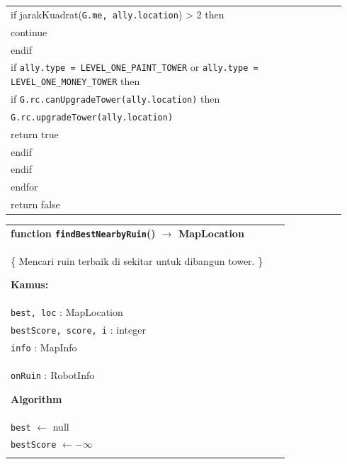 \documentclass{article}
\newenvironment{pseudobox}
{
\centering
\begin{longtable}{|p{0.94\linewidth}|}
\hline
}
{
\\ \hline
\end{longtable}
\vspace{0.05cm}
}
\begin{document}
\begin{enumerate}[label=\alph*.]
\begin{enumerate}[label=\alph*.]
\begin{pseudobox}
\hspace*{3em}if jarakKuadrat(\texttt{G.me, ally.location}) > 2 then \\
\hspace*{4.5em}continue \\
\hspace*{3em}endif \\

\hspace*{3em}if \texttt{ally.type = LEVEL\_ONE\_PAINT\_TOWER} or \texttt{ally.type = LEVEL\_ONE\_MONEY\_TOWER} then \\
\hspace*{4.5em}if \texttt{G.rc.canUpgradeTower(ally.location)} then \\
\hspace*{6em}\texttt{G.rc.upgradeTower(ally.location)} \\
\hspace*{6em}return true \\
\hspace*{4.5em}endif \\
\hspace*{3em}endif \\
\hspace*{1.5em}endfor \\

\hspace*{1.5em}return false
\end{pseudobox}

\begin{pseudobox}
\textbf{function \texttt{findBestNearbyRuin}() $\rightarrow$ MapLocation} \\
\{ Mencari ruin terbaik di sekitar untuk dibangun tower. \}

\textbf{Kamus:} \\
\hspace*{1.5em}\texttt{best, loc} : MapLocation \\
\hspace*{1.5em}\texttt{bestScore, score, i} : integer \\
\hspace*{1.5em}\texttt{info} : MapInfo \\
\hspace*{1.5em}\texttt{onRuin} : RobotInfo

\textbf{Algorithm} \\
\hspace*{1.5em}\texttt{best} $\leftarrow$ null \\
\hspace*{1.5em}\texttt{bestScore} $\leftarrow -\infty$ \\


\end{pseudobox}
\end{enumerate}
\end{enumerate}
\end{document}
